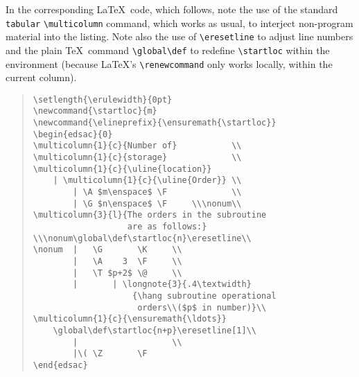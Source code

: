 \documentclass[letterpaper,11pt]{article}
\newcommand{\hang}{\leftskip=1em\parindent=-1em}
\begin{document}
In the corresponding \LaTeX\ code, which follows, note the use of the 
standard \texttt{tabular} \verb"\multicolumn" command, which works as
usual, to interject non-program material into the listing.  Note also
the use of \verb"\eresetline" to adjust line numbers and the plain
\TeX\ command \verb"\global\def" to redefine \verb"\startloc" within
the environment (because \LaTeX's \verb"\renewcommand" only works
locally, within the current column).
\begin{quote}\small
\begin{verbatim}
\setlength{\erulewidth}{0pt}
\newcommand{\startloc}{m}
\newcommand{\elineprefix}{\ensuremath{\startloc}}
\begin{edsac}{0}
\multicolumn{1}{c}{Number of}           \\
\multicolumn{1}{c}{storage}             \\
\multicolumn{1}{c}{\uline{location}}
    | \multicolumn{1}{c}{\uline{Order}} \\
        | \A $m\enspace$ \F             \\
        | \G $n\enspace$ \F     \\\nonum\\
\multicolumn{3}{l}{The orders in the subroutine
                   are as follows:}
\\\nonum\global\def\startloc{n}\eresetline\\
\nonum  |   \G       \K     \\
        |   \A    3  \F     \\
        |   \T $p+2$ \@     \\
        |       | \longnote{3}{.4\textwidth}
                    {\hang subroutine operational
                     orders\\($p$ in number)}\\
\multicolumn{1}{c}{\ensuremath{\ldots}}
    \global\def\startloc{n+p}\eresetline[1]\\
        |                   \\
        |\( \Z       \F
\end{edsac}
\end{verbatim}
\end{quote}
\end{document}
